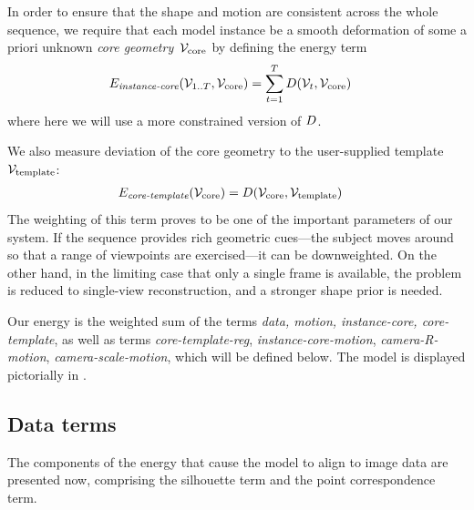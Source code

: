 \documentclass[preprint]{acmsiggraph}
\begin{document}
In order to ensure that the shape and motion are consistent across the whole sequence, we require that each model instance be a smooth deformation of some a priori unknown {\em core geometry}~$\mathcal{V}_{\text{core}}$ by defining the energy term
\begin{align}
E_{\text{\em instance-core}}(\mathcal{V}_{1..T}, \mathcal{V}_{\text{core}}) &= \sum_{t=1}^T D(\mathcal{V}_t, \mathcal{V}_{\text{core}}) 
\label{eq:Einscor0}
\end{align}
where here we will use a more constrained version of $D$.

We also measure deviation of the core geometry to the user-supplied template $\mathcal{V}_{\text{template}}$:
\begin{align}
E_{\text{\em core-template}}(\mathcal{V}_{\text{core}}) &= D(\mathcal{V}_{\text{core}}, \mathcal{V}_{\text{template}}) 
\label{eq:Ecortpl0}
\end{align}
The weighting of this term proves to be one of the important parameters of our system.   If the sequence provides rich geometric cues---the subject moves around so that a range of viewpoints are exercised---it can be downweighted.  On the other hand, in the limiting case that only a single frame is available, the problem is reduced to single-view reconstruction, and a stronger shape prior is needed.

Our energy is the weighted sum of the terms {\em data, motion, instance-core, core-template}, as well as terms {\em core-template-reg}, {\em instance-core-motion}, {\em camera-R-motion}, {\em camera-scale-motion}, which will be defined below.  The model is displayed pictorially in .

\subsection{Data terms}
The components of the energy that cause the model to align to image data are presented now, comprising the silhouette term and the point correspondence term.
\end{document}
